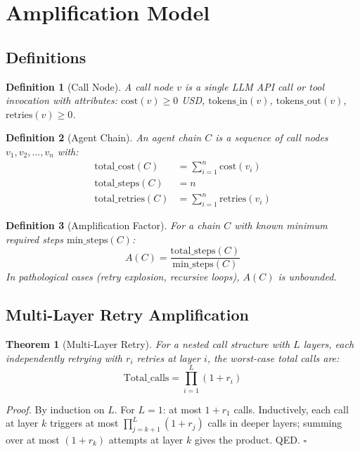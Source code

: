 \documentclass[11pt]{article}
\newtheorem{theorem}{Theorem}
\newtheorem{definition}{Definition}
\newenvironment{proof}{\par\noindent\textit{Proof.}\enspace}{\hfill$\square$\par\medskip}
\begin{document}
\section{Amplification Model}
\label{sec:amplification}

\subsection{Definitions}

\begin{definition}[Call Node]
A call node $v$ is a single LLM API call or tool invocation with attributes:
$\mathrm{cost}(v) \geq 0$ USD, $\mathrm{tokens\_in}(v)$,
$\mathrm{tokens\_out}(v)$, $\mathrm{retries}(v) \geq 0$.
\end{definition}

\begin{definition}[Agent Chain]
An agent chain $C$ is a sequence of call nodes $v_1, v_2, \ldots, v_n$ with:
\begin{align}
  \text{total\_cost}(C) &= \sum_{i=1}^{n} \mathrm{cost}(v_i) \\
  \text{total\_steps}(C) &= n \\
  \text{total\_retries}(C) &= \sum_{i=1}^{n} \mathrm{retries}(v_i)
\end{align}
\end{definition}

\begin{definition}[Amplification Factor]
For a chain $C$ with known minimum required steps $\text{min\_steps}(C)$:
\[
  A(C) = \frac{\text{total\_steps}(C)}{\text{min\_steps}(C)}
\]
In pathological cases (retry explosion, recursive loops), $A(C)$ is unbounded.
\end{definition}

\subsection{Multi-Layer Retry Amplification}

\begin{theorem}[Multi-Layer Retry]
For a nested call structure with $L$ layers, each independently retrying with
$r_i$ retries at layer $i$, the worst-case total calls are:
\[
  \text{Total\_calls} = \prod_{i=1}^{L} (1 + r_i)
\]
\end{theorem}

\begin{proof}
By induction on $L$. For $L{=}1$: at most $1 + r_1$ calls. Inductively, each
call at layer $k$ triggers at most $\prod_{j=k+1}^{L} (1 + r_j)$ calls in
deeper layers; summing over at most $(1 + r_k)$ attempts at layer $k$ gives
the product. QED.
\end{proof}
\end{document}
